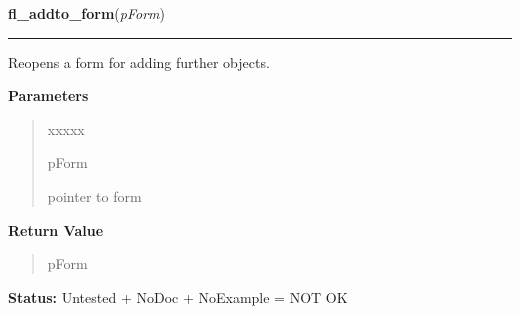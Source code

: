 \hspace{.8\funcindent}\begin{boxedminipage}{\funcwidth}

    \raggedright \textbf{fl\_addto\_form}(\textit{pForm})

    \vspace{-1.5ex}

    \rule{\textwidth}{0.5\fboxrule}
\setlength{\parskip}{2ex}
    Reopens a form for adding further objects.

\setlength{\parskip}{1ex}
      \textbf{Parameters}
      \vspace{-1ex}

      \begin{quote}
        \begin{Ventry}{xxxxx}

          \item[pForm]

          pointer to form

        \end{Ventry}

      \end{quote}

      \textbf{Return Value}
    \vspace{-1ex}

      \begin{quote}
      pForm

      \end{quote}

\textbf{Status:} Untested + NoDoc + NoExample = NOT OK



    \end{boxedminipage}

    \label{xformslib:library:fl_make_object}

    \vspace{0.5ex}

